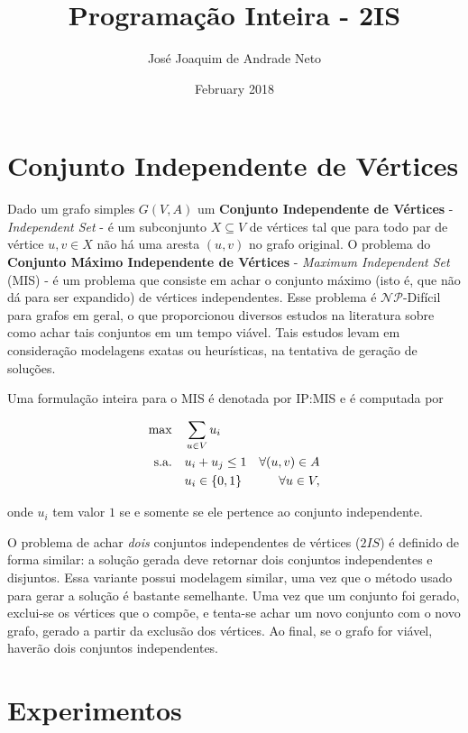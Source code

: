 \documentclass[12pt]{article}
\title{Programação Inteira - 2IS}
\author{José Joaquim de Andrade Neto}
\date{February 2018}
\begin{document}
\maketitle

\section{Conjunto Independente de Vértices}

Dado um grafo simples $G(V, A)$ um \textbf{Conjunto Independente de Vértices} - \textit{Independent Set} - é um subconjunto $X \subseteq V$ de vértices tal que para todo par de vértice $u, v \in X$ não há uma aresta $(u, v)$ no grafo original. 
O problema do \textbf{Conjunto Máximo Independente de Vértices} - \textit{Maximum Independent Set} (MIS) - é um problema que consiste em achar o conjunto máximo (isto é, que não dá para ser expandido) de vértices independentes. 
Esse problema é $\mathcal{NP}$-Difícil para grafos em geral, o que proporcionou diversos estudos na literatura sobre como achar tais conjuntos em um tempo viável. Tais estudos levam em consideração modelagens exatas ou heurísticas, na tentativa de geração de soluções.

Uma formulação inteira para o MIS é denotada por IP:MIS e é computada por

\begin{align*}	
  \max\quad        & \sum_{u \in V} u_i                                                          \\
  \text{s.a.\quad} & u_i + u_j \leq 1 &  \forall (u, v) \in A  								 \\
                   & u_i \in \{0, 1\} & \forall u \in V,
\end{align*}

\noindent
onde $u_i$ tem valor $1$ se e somente se ele pertence ao conjunto independente.

O problema de achar \textsl{dois} conjuntos independentes de vértices ($2IS$) é definido de forma similar: a solução gerada deve retornar dois conjuntos independentes e disjuntos. 
Essa variante possui modelagem similar, uma vez que o método usado para gerar a solução é bastante semelhante. 
Uma vez que um conjunto foi gerado, exclui-se os vértices que o compõe, e tenta-se achar um novo conjunto com o novo grafo, gerado a partir da exclusão dos vértices. Ao final, se o grafo for viável, haverão dois conjuntos independentes.

\section{Experimentos}
\end{document}
